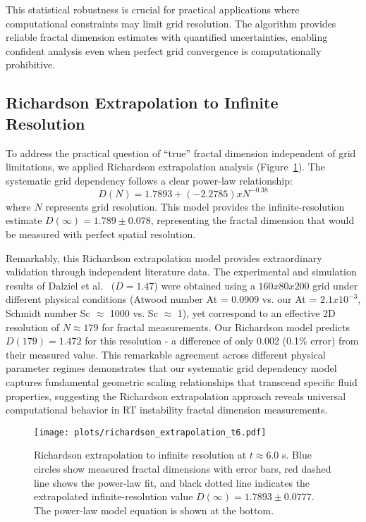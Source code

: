 \documentclass[preprint,12pt]{elsarticle}
\def\times{x}%
\begin{document}
This statistical robustness is crucial for practical applications where computational constraints may limit grid resolution. The algorithm provides reliable fractal dimension estimates with quantified uncertainties, enabling confident analysis even when perfect grid convergence is computationally prohibitive.

\subsection{Richardson Extrapolation to Infinite Resolution}
\label{subsec:richardson_extrapolation}

To address the practical question of ``true'' fractal dimension independent of grid limitations, we applied Richardson extrapolation analysis (Figure~\ref{fig:richardson_extrapolation}). The systematic grid dependency follows a clear power-law relationship:
\begin{equation}
D(N) = 1.7893 + (-2.2785) \times N^{-0.38}
\label{eq:richardson_model}
\end{equation}
where $N$ represents grid resolution. This model provides the infinite-resolution estimate $D(\infty) = 1.789 \pm 0.078$, representing the fractal dimension that would be measured with perfect spatial resolution.

Remarkably, this Richardson extrapolation model provides extraordinary validation through independent literature data. The experimental and simulation results of Dalziel et al.~\cite{dalziel1999} ($D = 1.47$) were obtained using a $160 \times 80 \times 200$ grid under different physical conditions (Atwood number At = 0.0909 vs. our At = $2.1 \times 10^{-3}$, Schmidt number Sc $\approx$ 1000 vs. Sc $\approx$ 1), yet correspond to an effective 2D resolution of $N \approx 179$ for fractal measurements. Our Richardson model predicts $D(179) = 1.472$ for this resolution - a difference of only 0.002 (0.1\% error) from their measured value. This remarkable agreement across different physical parameter regimes demonstrates that our systematic grid dependency model captures fundamental geometric scaling relationships that transcend specific fluid properties, suggesting the Richardson extrapolation approach reveals universal computational behavior in RT instability fractal dimension measurements.

\begin{figure}[htb]
\centering
\texttt{[image: plots/richardson\_extrapolation\_t6.pdf]}
\caption{Richardson extrapolation to infinite resolution at $t \approx 6.0$ s. Blue circles show measured fractal dimensions with error bars, red dashed line shows the power-law fit, and black dotted line indicates the extrapolated infinite-resolution value $D(\infty) = 1.7893 \pm 0.0777$. The power-law model equation is shown at the bottom.}
\label{fig:richardson_extrapolation}
\end{figure}
\end{document}
